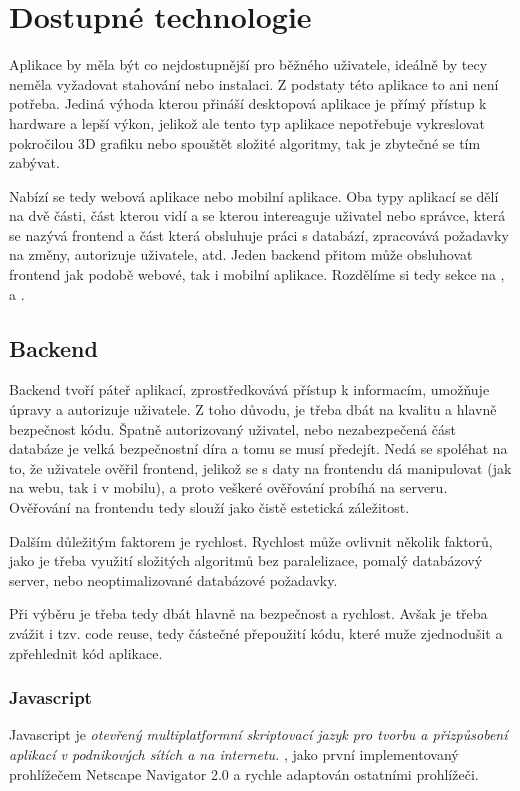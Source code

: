 \section{Dostupné technologie}
\label{sc:available_technologies}
Aplikace by měla být co nejdostupnější pro běžného uživatele, ideálně by tecy neměla vyžadovat stahování nebo instalaci. Z podstaty této aplikace to ani není potřeba. Jediná výhoda kterou přináší desktopová aplikace je přímý přístup k hardware a lepší výkon, jelikož ale tento typ aplikace nepotřebuje vykreslovat pokročilou 3D grafiku nebo spouštět složité algoritmy, tak je zbytečné se tím zabývat.

Nabízí se tedy webová aplikace nebo mobilní aplikace. Oba typy aplikací se dělí na dvě části, část kterou vidí a se kterou intereaguje uživatel nebo správce, která se nazývá frontend a část která obsluhuje práci s databází, zpracovává požadavky na změny, autorizuje uživatele, atd. Jeden backend přitom může obsluhovat frontend jak podobě webové, tak i mobilní aplikace. Rozdělíme si tedy sekce na ,  a .

\subsection{Backend}
\label{ss:backend}
Backend tvoří páteř aplikací, zprostředkovává přístup k informacím, umožňuje úpravy a autorizuje uživatele. Z toho důvodu, je třeba dbát na kvalitu a hlavně bezpečnost kódu. Špatně autorizovaný uživatel, nebo nezabezpečená část databáze je velká bezpečnostní díra a tomu se musí předejít. Nedá se spoléhat na to, že uživatele ověřil frontend, jelikož se s daty na frontendu dá manipulovat (jak na webu, tak i v mobilu), a proto veškeré ověřování probíhá na serveru. Ověřování na frontendu tedy slouží jako čistě estetická záležitost.

Dalším důležitým faktorem je rychlost. Rychlost může ovlivnit několik faktorů, jako je třeba využití složitých algoritmů bez paralelizace, pomalý databázový server, nebo neoptimalizované databázové požadavky.

Při výběru je třeba tedy dbát hlavně na bezpečnost a rychlost. Avšak je třeba zvážit i tzv. code reuse, tedy částečné přepoužití kódu, které muže zjednodušit a zpřehlednit kód aplikace.

\subsubsection{Javascript}
Javascript je \textit{otevřený multiplatformní skriptovací jazyk pro tvorbu a přizpůsobení aplikací v podnikových sítích a na internetu.} \cite{netscapecommunicationscorporation_1995_press}, jako první implementovaný prohlížečem Netscape Navigator 2.0 a rychle adaptován ostatními prohlížeči.

